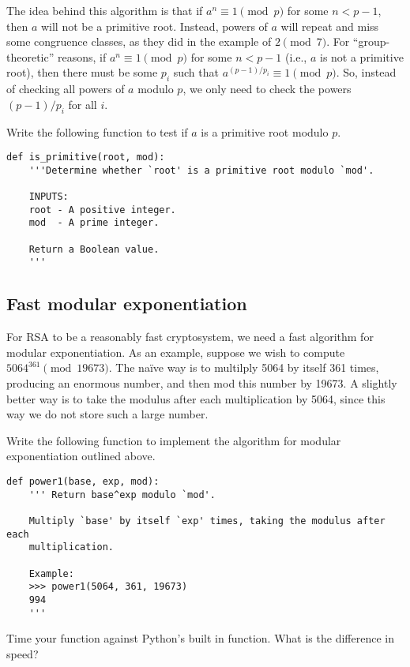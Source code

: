 The idea behind this algorithm is that if $a^n \equiv 1 \pmod{p}$ for some $n<p-1$, then $a$ will not be a primitive root.
Instead, powers of $a$ will repeat and miss some congruence classes, as they did in the example of $2 \pmod{7}$.
For ``group-theoretic'' reasons, if $a^n \equiv 1 \pmod{p}$ for some $n<p-1$ (i.e., $a$ is not a primitive root), then there must be some $p_i$ such that $a^{(p-1)/p_i} \equiv 1 \pmod{p}$.
So, instead of checking all powers of $a$ modulo $p$, we only need to check the powers $(p-1)/p_i$ for all $i$.

\begin{problem}
Write the following function to test if $a$ is a primitive root modulo $p$.
\begin{lstlisting}
def is_primitive(root, mod):
    '''Determine whether `root' is a primitive root modulo `mod'.
    
    INPUTS:
    root - A positive integer.
    mod  - A prime integer.
    
    Return a Boolean value.
    '''
\end{lstlisting}
\end{problem}


\subsection*{Fast modular exponentiation}


For RSA to be a reasonably fast cryptosystem, we need a fast algorithm for modular exponentiation.
As an example, suppose we wish to compute $5064^{361} \pmod{19673}.$
The na\"ive way is to multilply 5064 by itself 361 times, producing an enormous number, and then mod this number by 19673.
A slightly better way is to take the modulus after each multiplication by 5064, since this way we do not store such a large number.

\begin{problem}\label{prob:power1}
Write the following function to implement the algorithm for modular exponentiation outlined above.
\begin{lstlisting}
def power1(base, exp, mod):
    ''' Return base^exp modulo `mod'.
    
    Multiply `base' by itself `exp' times, taking the modulus after each 
    multiplication.
    
    Example:
    >>> power1(5064, 361, 19673)
    994
    '''
\end{lstlisting}

Time your function against Python's built in  function.
What is the difference in speed?
\end{problem}

